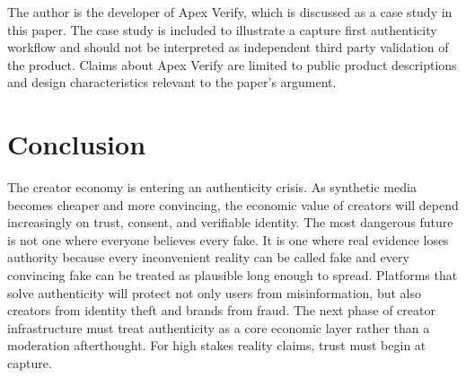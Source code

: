 \documentclass[11pt]{article}
\begin{document}
The author is the developer of Apex Verify, which is discussed as a case study in this paper. The case study is included to illustrate a capture first authenticity workflow and should not be interpreted as independent third party validation of the product. Claims about Apex Verify are limited to public product descriptions and design characteristics relevant to the paper's argument.

\section{Conclusion}

The creator economy is entering an authenticity crisis. As synthetic media becomes cheaper and more convincing, the economic value of creators will depend increasingly on trust, consent, and verifiable identity. The most dangerous future is not one where everyone believes every fake. It is one where real evidence loses authority because every inconvenient reality can be called fake and every convincing fake can be treated as plausible long enough to spread. Platforms that solve authenticity will protect not only users from misinformation, but also creators from identity theft and brands from fraud. The next phase of creator infrastructure must treat authenticity as a core economic layer rather than a moderation afterthought. For high stakes reality claims, trust must begin at capture.



\end{document}

